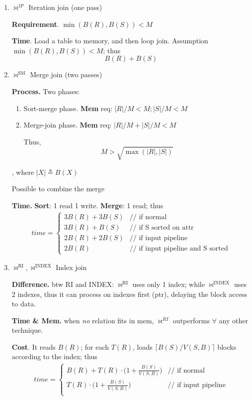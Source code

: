 \documentclass[a4paper]{report}
\begin{document}
\begin{enumerate}
\item $\bowtie^{\text{1P}}$ Iteration join (one pass)

\textbf{Requirement}. $\min(B(R), B(S)) < M$

\textbf{Time}. Load a table to memory, and then loop join. Assumption $\min(B(R), B(S))<M$; thus
$$B(R)+B(S)$$
\item $\bowtie^\text{SM}$ Merge join (two passes)

\textbf{Process.} Two phases:
\begin{enumerate}
\item Sort-merge phase. \textbf{Mem} req: $|R|/M<M; |S|/M<M $
\item Merge-join phase. \textbf{Mem} req: $|R|/M+|S|/M <M$

Thus,
$$
M>\sqrt{\max{(|R|,|S|)}}
$$
\end{enumerate}

, where $|X|\triangleq B(X)$

Possible to combine the merge 

\textbf{Time.} \textbf{Sort}: 1 read 1 write. \textbf{Merge}: 1 read; thus 
\begin{eqnarray*}
time = \left\{ \begin{array}{rl}
  3B(R)+3B(S) &\text{// if normal} \\
  3B(R)+B(S) &\text{// if S sorted on attr} \\
  2B(R)+2B(S) &\text{// if input pipeline}\\
  2B(R) &\text{// if input pipeline and S sorted}
       \end{array} \right.
\end{eqnarray*}
\item $\bowtie^\text{RI}, \bowtie^\text{INDEX}$ Index join 

\textbf{Difference.} btw RI and INDEX: $\bowtie^\text{RI}$ uses only 1 index; while $\bowtie^\text{INDEX}$ uses 2 indexes, thus it can process on indexes first (ptr), delaying the block access to data. 

\textbf{Time \& Mem.} when \textit{no} relation fits in mem, $\bowtie^{RI}$ outperforms $\forall$ any other technique. 

\textbf{Cost}. It reads $B(R)$; for each $T(R)$, loads $\lceil B(S)/V(S, B)\rceil$ blocks according to the index; thus 
\begin{eqnarray*}
time = \left\{ \begin{array}{rl}
  B(R)+T(R)\cdot \big(1+\frac{B(S)}{V(S, B)}\big) &\text{// if normal} \\
  T(R)\cdot \big(1+\frac{B(S)}{V(S, B)}\big) &\text{// if input pipeline}\\
       \end{array} \right.
\end{eqnarray*}


\end{enumerate}
\end{document}
